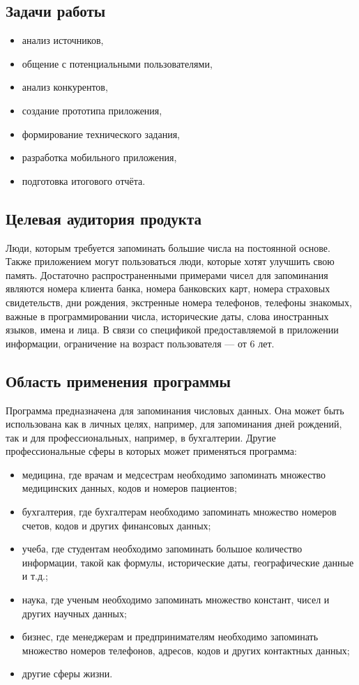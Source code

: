 \documentclass[draft]{article}
\begin{document}
\subsection{Задачи работы}
\begin{itemize}
\item анализ источников,
\item общение с потенциальными пользователями,
\item анализ конкурентов,
\item создание прототипа приложения,
\item формирование технического задания,
\item разработка мобильного приложения,
\item подготовка итогового отчёта.
\end{itemize}
\subsection{Целевая аудитория продукта}
Люди, которым требуется запоминать большие числа на постоянной основе. Также приложением могут пользоваться люди, которые хотят улучшить свою память. Достаточно распространенными примерами чисел для запоминания являются номера клиента банка, номера банковских карт, номера страховых свидетельств, дни рождения, экстренные номера телефонов, телефоны знакомых, важные в программировании числа, исторические даты, слова иностранных языков, имена и лица. В связи со спецификой предоставляемой в приложении информации, ограничение на возраст пользователя — от 6 лет.
\subsection{Область применения программы}
Программа предназначена для запоминания числовых данных. Она может быть использована как в личных целях, например, для запоминания дней рождений, так и для профессиональных, например, в бухгалтерии. Другие профессиональные сферы в которых может применяться программа:
\begin{itemize}
\item медицина, где врачам и медсестрам необходимо запоминать множество медицинских данных, кодов и номеров пациентов;
\item бухгалтерия, где бухгалтерам необходимо запоминать множество номеров счетов, кодов и других финансовых данных;
\item учеба, где студентам необходимо запоминать большое количество информации, такой как формулы, исторические даты, географические данные и т.д.;
\item наука, где ученым необходимо запоминать множество констант, чисел и других научных данных;
\item бизнес, где менеджерам и предпринимателям необходимо запоминать множество номеров телефонов, адресов, кодов и других контактных данных;
\item другие сферы жизни.
\end{itemize}
\end{document}
